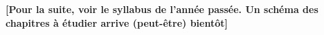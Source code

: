 
 \newpage 
 \newpage

\textbf{ [Pour la suite, voir le syllabus de l'année passée. Un schéma des chapitres à étudier arrive (peut-être) bientôt] }